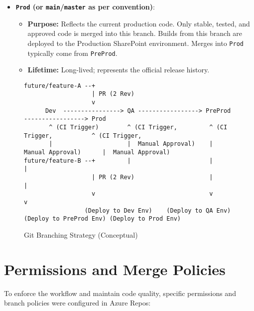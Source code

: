 \begin{itemize}
\begin{itemize}
    \end{itemize}
    \item \textbf{\texttt{Prod} (or \texttt{main}/\texttt{master} as per convention)}:
    \begin{itemize}
        \item \textbf{Purpose:} Reflects the current production code. Only stable, tested, and approved code is merged into this branch. Builds from this branch are deployed to the Production SharePoint environment. Merges into \texttt{Prod} typically come from \texttt{PreProd}.
        \item \textbf{Lifetime:} Long-lived; represents the official release history.
    \end{itemize}
\end{itemize}

\begin{figure}[htbp]
    \centering
    \begin{verbatim}
future/feature-A --+
                   | PR (2 Rev)
                   v
      Dev  ----------------> QA -----------------> PreProd -----------------> Prod
       ^ (CI Trigger)        ^ (CI Trigger,         ^ (CI Trigger,           ^ (CI Trigger,
       |                     |  Manual Approval)    |  Manual Approval)      |  Manual Approval)
future/feature-B --+         |                      |                        |
                   | PR (2 Rev)                     |                        |
                   v                                v                        v
                 (Deploy to Dev Env)    (Deploy to QA Env)   (Deploy to PreProd Env) (Deploy to Prod Env)
    \end{verbatim}
    \caption{Git Branching Strategy (Conceptual)}
    \label{fig:GitBranchingStrategy}
\end{figure}

\section{Permissions and Merge Policies}
\label{sec:PermissionsMergePolicies}

To enforce the workflow and maintain code quality, specific permissions and branch policies were configured in Azure Repos:

